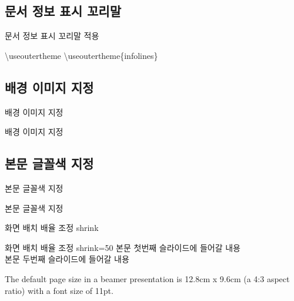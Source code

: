 \documentclass[10pt,blue,xcolor=pdftex,dvipsnames,table,handout]{beamer}
\begin{document}
		\subsection{문서 정보 표시 꼬리말}
		\begin{frame}{문서 정보 표시 꼬리말 적용}

			\begin{block} {\textbackslash useoutertheme}
			\textbackslash useoutertheme\{infolines\}
			\end{block}
		\end{frame}


		\subsection{배경 이미지 지정}
		\begin{frame}[shrink=0]{배경 이미지 지정}

			\begin{block} {배경 이미지 지정}
			\end{block}
		\end{frame}


		\subsection{본문 글꼴색 지정}
		\begin{frame}[shrink=0]{본문 글꼴색 지정}

			\begin{block} {본문 글꼴색 지정}
			\end{block}
		\end{frame}






		\begin{frame}[shrink=50]{화면 배치 배율 조정 shrink}
			
			\begin{block} {화면 배치 배율 조정 shrink=50}
			본문 첫번째 슬라이드에 들어갈 내용\\
			본문 두번째 슬라이드에 들어갈 내용
			\end{block}

			The default page size in a beamer presentation is 12.8cm x 9.6cm (a 4:3 aspect ratio) with a font size of 11pt.

		\end{frame}
\end{document}
